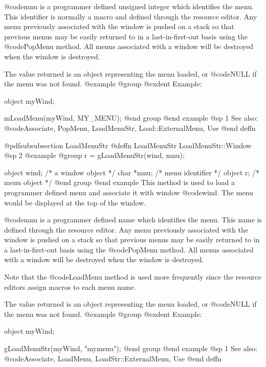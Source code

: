 @code{mnu} is a programmer defined unsigned integer which identifies the
menu.  This identifier is normally a macro and defined through the
resource editor.  Any menu previously associated with the window is
pushed on a stack so that previous menus may be easily returned to in a
last-in-first-out basis using the @code{PopMenu} method.  All menus
associated with a window will be destroyed when the window is destroyed.

The value returned is an object representing the menu loaded, or
@code{NULL} if the menu was not found.
@example
@group
@exdent Example:

object  myWind;

mLoadMenu(myWind, MY_MENU);
@end group
@end example
@sp 1
See also:  @code{Associate, PopMenu, LoadMenuStr, Load::ExternalMenu, Use}
@end deffn














@pdfsubsubsection {LoadMenuStr}
@deffn {LoadMenuStr} LoadMenuStr::Window
@sp 2
@example
@group
r = gLoadMenuStr(wind, mnu);

object   wind;  /*  a window object  */
char    *mnu;   /*  menu identifier  */
object   r;     /*  menu object      */
@end group
@end example
This method is used to load a programmer defined menu and associate it
with window @code{wind}.  The menu would be displayed at the top
of the window.

@code{mnu} is a programmer defined name which identifies the menu.  This
name is defined through the resource editor.  Any menu previously associated
with the window is pushed on a stack so that previous menus may be easily
returned to in a last-in-first-out basis using the @code{PopMenu} method.
All menus associated with a window will be destroyed when the window
is destroyed.

Note that the @code{LoadMenu} method is used more frequently since the
resource editors assign macros to each menu name.

The value returned is an object representing the menu loaded, or
@code{NULL} if the menu was not found.
@example
@group
@exdent Example:

object  myWind;

gLoadMenuStr(myWind, "mymenu");
@end group
@end example
@sp 1
See also:  @code{Associate, LoadMenu, LoadStr::ExternalMenu, Use}
@end deffn












